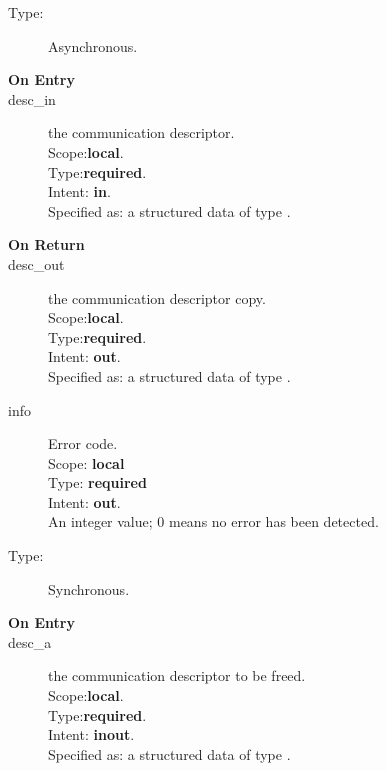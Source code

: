 %
%


\begin{description}
\item[Type:] Asynchronous.
\item[\bf On Entry]
\item[desc\_in] the communication descriptor.\\
Scope:{\bf local}.\\
Type:{\bf required}.\\
Intent: {\bf in}.\\
Specified as: a structured data of type \descdata.

\end{description}

\begin{description}
\item[\bf On Return]
\item[desc\_out] the communication descriptor copy.\\
Scope:{\bf local}.\\
Type:{\bf required}.\\
Intent: {\bf out}.\\
Specified as: a structured data of type \descdata.
\item[info] Error code.\\
Scope: {\bf local} \\
Type: {\bf required} \\
Intent: {\bf out}.\\
An integer value; 0 means no error has been detected. 
\end{description}


%
%


\begin{description}
\item[Type:] Synchronous.
\item[\bf On Entry]
\item[desc\_a] the communication descriptor to be freed.\\
Scope:{\bf local}.\\
Type:{\bf required}.\\
Intent: {\bf inout}.\\
Specified as: a structured data of type \descdata.
\end{description}

